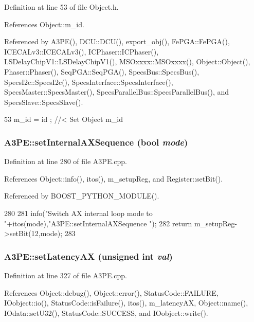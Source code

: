 Definition at line 53 of file Object.h.

References Object::m\_\-id.

Referenced by A3PE(), DCU::DCU(), export\_\-obj(), FePGA::FePGA(), ICECALv3::ICECALv3(), ICPhaser::ICPhaser(), LSDelayChipV1::LSDelayChipV1(), MSOxxxx::MSOxxxx(), Object::Object(), Phaser::Phaser(), SeqPGA::SeqPGA(), SpecsBus::SpecsBus(), SpecsI2c::SpecsI2c(), SpecsInterface::SpecsInterface(), SpecsMaster::SpecsMaster(), SpecsParallelBus::SpecsParallelBus(), and SpecsSlave::SpecsSlave().


\begin{DoxyCode}
53 { m_id    = id    ; } //< Set Object m_id
\end{DoxyCode}
\hypertarget{classA3PE_ad5f953a38661104a87834cc8a63252fa}{
\subsubsection[{setInternalAXSequence}]{ A3PE::setInternalAXSequence (bool {\em mode})}}
\label{classA3PE_ad5f953a38661104a87834cc8a63252fa}


Definition at line 280 of file A3PE.cpp.

References Object::info(), itos(), m\_\-setupReg, and Register::setBit().

Referenced by BOOST\_\-PYTHON\_\-MODULE().


\begin{DoxyCode}
280                                                {
281   info("Switch AX internal loop mode to "+itos(mode),"A3PE::setInternalAXSequence
      ");
282   return m_setupReg->setBit(12,mode);
283 }
\end{DoxyCode}
\hypertarget{classA3PE_a53882e1272e8146e51837904ea00f33c}{
\subsubsection[{setLatencyAX}]{ A3PE::setLatencyAX (unsigned int {\em val})}}
\label{classA3PE_a53882e1272e8146e51837904ea00f33c}


Definition at line 327 of file A3PE.cpp.

References Object::debug(), Object::error(), StatusCode::FAILURE, IOobject::io(), StatusCode::isFailure(), itos(), m\_\-latencyAX, Object::name(), IOdata::setU32(), StatusCode::SUCCESS, and IOobject::write().

